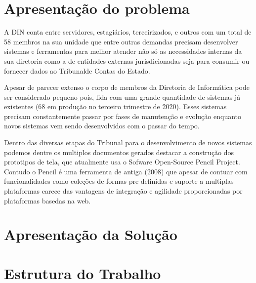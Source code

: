 \section{Apresentação do problema }

  A DIN conta entre servidores, estagiários, terceirizados, e outros com um total de 58 membros na sua unidade \cite{relatorio_trimestral} que entre outras demandas precisam desenvolver sistemas e ferramentas para melhor atender não só as necessidades internas da sua diretoria como a de entidades externas jurisdicionadas seja para consumir ou fornecer dados ao Tribunalde Contas do Estado.

  Apesar de parecer extenso o corpo de membros da Diretoria de Informática pode ser considerado pequeno pois, lida com uma grande quantidade de sistemas já existentes (68 em produção no terceiro trimestre de 2020). Esses sistemas precisam constantemente passar por fases de manutenção e evolução enquanto novos sistemas vem sendo desenvolvidos com o passar do tempo.

  Dentro das diversas etapas do Tribunal para o desenvolvimento de novos sistemas podemos dentre os multiplos documentos gerados destacar a construção dos prototipos de tela, que atualmente usa o Sofware Open-Source Pencil Project. Contudo o Pencil é uma ferramenta de antiga (2008) que apesar de contuar com funcionalidades como coleções de formas pre definidas e suporte a multiplas plataformas carece das vantagens de integração e agilidade proporcionadas por plataformas basedas na web.


  \section{Apresentação da Solução}
  \lipsum[1-1]
  
  \section{Estrutura do Trabalho}
  \lipsum[1-1]
